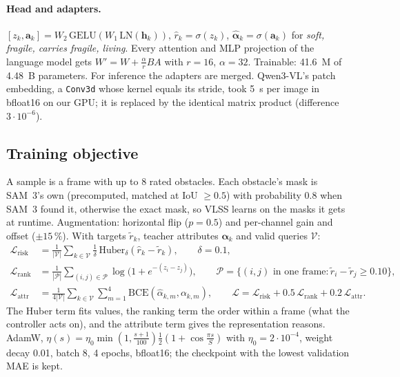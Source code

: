 \documentclass[10pt,a4paper]{article}
\newcommand{\code}[1]{\texttt{#1}}
\begin{document}
\paragraph{Head and adapters.} $[z_k,\bm a_k]=W_2\,\mathrm{GELU}(W_1\,\mathrm{LN}(\bm h_k))$, $\hat r_k=\sigma(z_k)$,
$\hat{\bm\alpha}_k=\sigma(\bm a_k)$ for \emph{soft, fragile, carries fragile, living}. Every attention and MLP projection of the
language model gets $W'=W+\frac{\alpha}{r}BA$ with $r=16$, $\alpha=32$. Trainable: 41.6~M of 4.48~B parameters. For inference the
adapters are merged. Qwen3-VL's patch embedding, a \code{Conv3d} whose kernel equals its stride, took 5~s per image in bfloat16 on
our GPU; it is replaced by the identical matrix product (difference $3\cdot10^{-6}$).

\subsection{Training objective}\label{sec:training}
A sample is a frame with up to 8 rated obstacles. Each obstacle's mask is SAM~3's own (precomputed, matched at IoU $\geq0.5$) with
probability 0.8 when SAM~3 found it, otherwise the exact mask, so VLSS learns on the masks it gets at runtime. Augmentation:
horizontal flip ($p=0.5$) and per-channel gain and offset ($\pm15\,\%$). With targets $\tilde r_k$, teacher attributes
$\bm\alpha_k$ and valid queries $\mathcal V$:
\begin{align}
\mathcal L_{\text{risk}} &= \frac{1}{|\mathcal V|}\sum_{k\in\mathcal V}\frac{1}{\delta}\,\mathrm{Huber}_\delta(\hat r_k-\tilde r_k),\qquad \delta=0.1,\\
\mathcal L_{\text{rank}} &= \frac{1}{|\mathcal P|}\sum_{(i,j)\in\mathcal P}\log\big(1+e^{-(z_i-z_j)}\big),\qquad
\mathcal P=\{(i,j)\text{ in one frame}: \tilde r_i-\tilde r_j\geq0.10\},\\
\mathcal L_{\text{attr}} &= \frac{1}{4|\mathcal V|}\sum_{k\in\mathcal V}\sum_{m=1}^{4}\mathrm{BCE}(\hat\alpha_{k,m},\alpha_{k,m}),\qquad
\mathcal L = \mathcal L_{\text{risk}} + 0.5\,\mathcal L_{\text{rank}} + 0.2\,\mathcal L_{\text{attr}}.
\end{align}
The Huber term fits values, the ranking term the order within a frame (what the controller acts on), and the attribute term gives
the representation reasons. AdamW, $\eta(s)=\eta_0\min(1,\frac{s+1}{100})\frac12(1+\cos\frac{\pi s}{S})$ with $\eta_0=2\cdot10^{-4}$,
weight decay 0.01, batch 8, 4 epochs, bfloat16; the checkpoint with the lowest validation MAE is kept.
\end{document}

